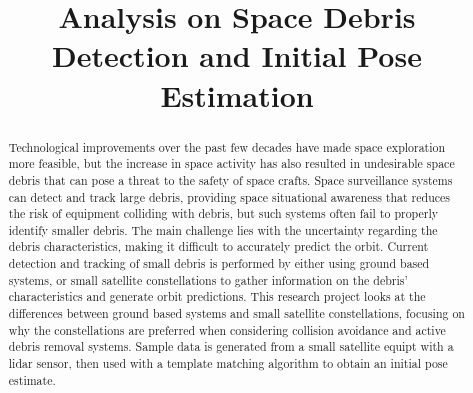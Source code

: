 \documentclass[conference]{IEEEtran}
\begin{document}
	
	\title{Analysis on Space Debris Detection and Initial Pose Estimation}

	\author{
	}

	\maketitle
	
	
	\begin{abstract}
		
		Technological improvements over the past few decades have made space exploration more feasible, but the increase in space activity has also resulted in undesirable space debris that can pose a threat to the safety of space crafts. 
		Space surveillance systems can detect and track large debris, providing space situational awareness that reduces the risk of equipment colliding with debris, but such systems often fail to properly identify smaller debris. The main challenge lies with the uncertainty regarding the debris characteristics, making it difficult to accurately predict the orbit.
		Current detection and tracking of small debris is performed by either using ground based systems, or small satellite constellations to gather information on the debris' characteristics and generate orbit predictions.
		This research project looks at the differences between ground based systems and small satellite constellations, focusing on why the constellations are preferred when considering collision avoidance and active debris removal systems. Sample data is generated from a small satellite equipt with a lidar sensor, then used with a template matching algorithm to obtain an initial pose estimate.

	\end{abstract}

\end{document}
